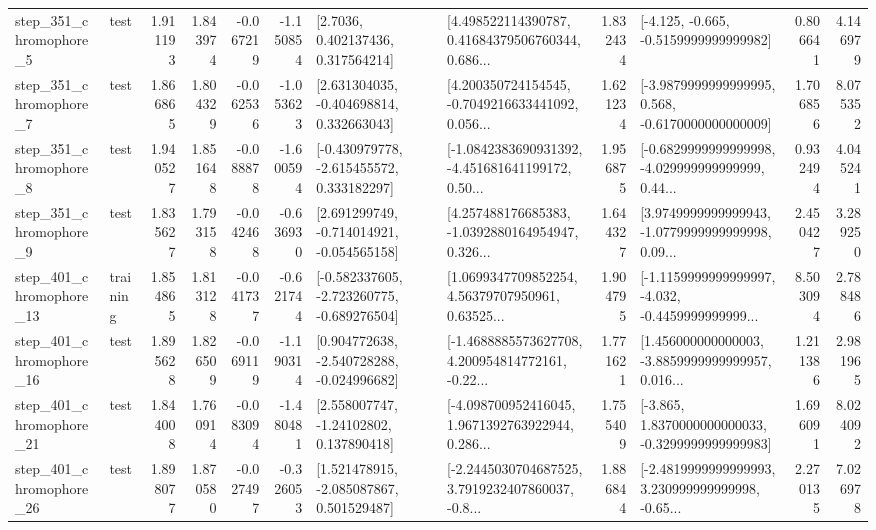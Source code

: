\begin{tabular}{llrrrrllrlrr}
   step\_351\_chromophore\_5 &      test &      1.911193 &    1.843974 &     -0.067219 & -1.150854 &          [2.7036, 0.402137436, 0.317564214] &  [4.498522114390787, 0.41684379506760344, 0.686... &       1.832434 &              [-4.125, -0.665, -0.5159999999999982] &            0.806641 &          4.146979 \\
   step\_351\_chromophore\_7 &      test &      1.866865 &    1.804329 &     -0.062536 & -1.053623 &    [2.631304035, -0.404698814, 0.332663043] &  [4.200350724154545, -0.7049216633441092, 0.056... &       1.621234 &  [-3.9879999999999995, 0.568, -0.6170000000000009] &            1.706856 &          8.075352 \\
   step\_351\_chromophore\_8 &      test &      1.940527 &    1.851648 &     -0.088878 & -1.600594 &   [-0.430979778, -2.615455572, 0.333182297] &  [-1.0842383690931392, -4.451681641199172, 0.50... &       1.956875 &  [-0.6829999999999998, -4.029999999999999, 0.44... &            0.932494 &          4.045241 \\
   step\_351\_chromophore\_9 &      test &      1.835627 &    1.793158 &     -0.042468 & -0.636930 &   [2.691299749, -0.714014921, -0.054565158] &  [4.257488176685383, -1.0392880164954947, 0.326... &       1.644327 &  [3.9749999999999943, -1.0779999999999998, 0.09... &            2.450427 &          3.289250 \\
  step\_401\_chromophore\_13 &  training &      1.854865 &    1.813128 &     -0.041737 & -0.621744 &  [-0.582337605, -2.723260775, -0.689276504] &  [1.0699347709852254, 4.56379707950961, 0.63525... &       1.904795 &  [-1.1159999999999997, -4.032, -0.4459999999999... &            8.503094 &          2.788486 \\
  step\_401\_chromophore\_16 &      test &      1.895628 &    1.826509 &     -0.069119 & -1.190314 &   [0.904772638, -2.540728288, -0.024996682] &  [-1.4688885573627708, 4.200954814772161, -0.22... &       1.771621 &  [1.456000000000003, -3.8859999999999957, 0.016... &            1.211386 &          2.981965 \\
  step\_401\_chromophore\_21 &      test &      1.844008 &    1.760914 &     -0.083094 & -1.480481 &     [2.558007747, -1.24102802, 0.137890418] &  [-4.098700952416045, 1.9671392763922944, 0.286... &       1.755409 &  [-3.865, 1.8370000000000033, -0.3299999999999983] &            1.696091 &          8.024092 \\
  step\_401\_chromophore\_26 &      test &      1.898077 &    1.870580 &     -0.027497 & -0.326053 &    [1.521478915, -2.085087867, 0.501529487] &  [-2.2445030704687525, 3.7919232407860037, -0.8... &       1.886844 &  [-2.4819999999999993, 3.230999999999998, -0.65... &            2.270135 &          7.026978 \\

\end{tabular}
